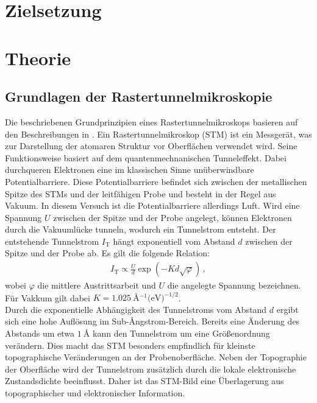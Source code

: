 \section{Zielsetzung}
\label{sec:Zielsetzung}

\section{Theorie}
\label{sec:Theorie}
\subsection{Grundlagen der Rastertunnelmikroskopie}
\label{sec:GrundlagenSTM}
Die beschriebenen Grundprinzipien eines Rastertunnelmikroskops basieren auf den Beschreibungen in \cite{Surfaces}.
Ein Rastertunnelmikroskop (STM) ist ein Messgerät, was zur Darstellung der atomaren Struktur vor Oberflächen verwendet wird.
Seine Funktionsweise basiert auf dem quantenmechnanischen Tunneleffekt. 
Dabei durchqueren Elektronen eine im klassischen Sinne unüberwindbare Potentialbarriere. 
Diese Potentialbarriere befindet sich zwischen der metallischen Spitze des STMs und der leitfähigen Probe und besteht in der Regel aus Vakuum. In diesem Versuch ist die Potentialbarriere allerdings Luft.
Wird eine Spannung $U$ zwischen der Spitze und der Probe angelegt, können Elektronen durch die Vakuumlücke tunneln, wodurch ein Tunnelstrom entsteht.
Der entstehende Tunnelstrom $I_{\text{T}}$ hängt exponentiell vom Abstand $d$ zwischen der Spitze und der Probe ab. Es gilt die folgende Relation:
\begin{align}
    I_{\text{T}} \propto \frac{U}{d}\exp\left(-K d \sqrt{\varphi}\right)\,, \label{eqn:Tunnelstrom}
\end{align}
wobei $\varphi$ die mittlere Austrittsarbeit und $U$ die angelegte Spannung bezeichnen. 
Für Vakkum gilt dabei $K = \SI{1.025}{\angstrom^{-1} (\eV)^{-1/2}}$.\\

Durch die exponentielle Abhängigkeit des Tunnelstroms vom Abstand $d$ ergibt sich eine hohe Auflösung im Sub-{\AA}ngstrom-Bereich. 
Bereits eine Änderung des Abstands um etwa $\SI{1}{\angstrom}$ kann den Tunnelstrom um eine Größenordnung verändern. Dies macht das STM besonders empfindlich für kleinste topographische Veränderungen an der Probenoberfläche.
Neben der Topographie der Oberfläche wird der Tunnelstrom zusätzlich durch die lokale elektronische Zustandsdichte beeinflusst. 
Daher ist das STM-Bild eine Überlagerung aus topographischer und elektronischer Information.\\

